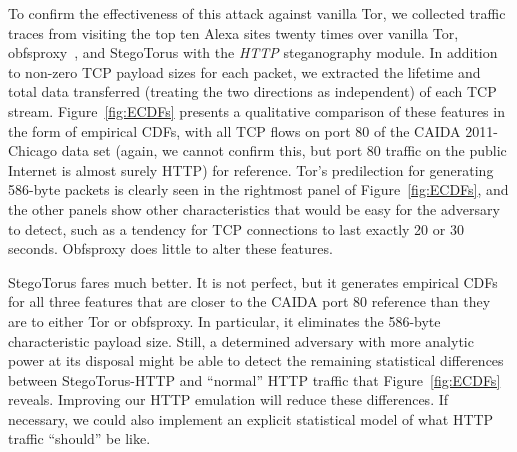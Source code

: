 To confirm the effectiveness of this attack against vanilla Tor, we
collected traffic traces from visiting the top ten Alexa sites twenty
times over vanilla Tor, obfsproxy~\cite{n-iran-ob}, and StegoTorus
with the \textit{HTTP} steganography module.  In addition to non-zero
TCP payload sizes for each packet, we extracted the lifetime and total
data transferred (treating the two directions as independent) of each
TCP stream.  Figure~\ref{fig:ECDFs} presents a qualitative comparison
of these features in the form of empirical CDFs, with all TCP flows on
port 80 of the CAIDA 2011-Chicago data set (again, we cannot confirm
this, but port 80 traffic on the public Internet is almost surely
HTTP) for reference.  Tor's predilection for generating 586-byte
packets is clearly seen in the rightmost panel of
Figure~\ref{fig:ECDFs}, and the other panels show other
characteristics that would be easy for the adversary to detect, such
as a tendency for TCP connections to last exactly 20 or 30 seconds.
Obfsproxy does little to alter these features.

StegoTorus fares much better.  It is not perfect, but it generates
empirical CDFs for all three features that are closer to the CAIDA
port 80 reference than they are to either Tor or obfsproxy.  In
particular, it eliminates the 586-byte characteristic payload size.
Still, a determined adversary with more analytic power at its disposal
might be able to detect the remaining statistical differences between
StegoTorus-HTTP and “normal” HTTP traffic that Figure~\ref{fig:ECDFs}
reveals.  Improving our HTTP emulation will reduce these differences.
If necessary, we could also implement an explicit statistical model of
what HTTP traffic “should” be like.
